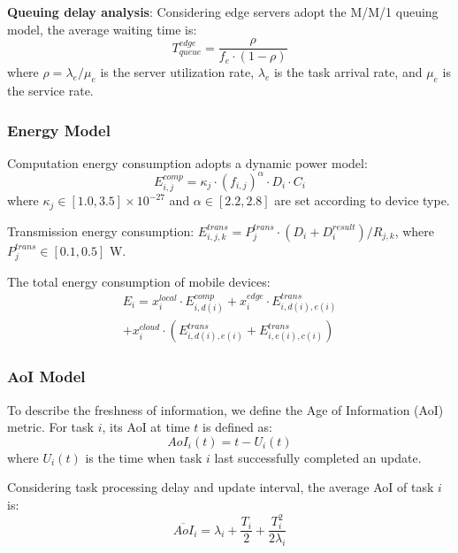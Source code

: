 \documentclass[conference]{IEEEtran}
\begin{document}
\textbf{Queuing delay analysis}: Considering edge servers adopt the M/M/1 queuing model, the average waiting time is:
\begin{equation}
T_{queue}^{edge} = \frac{\rho}{f_e \cdot (1-\rho)}
\end{equation}
where $\rho = \lambda_e / \mu_e$ is the server utilization rate, $\lambda_e$ is the task arrival rate, and $\mu_e$ is the service rate.

\subsubsection{Energy Model}
Computation energy consumption adopts a dynamic power model:
\begin{equation}
E_{i,j}^{comp} = \kappa_j \cdot (f_{i,j})^{\alpha} \cdot D_i \cdot C_i
\end{equation}
where $\kappa_j \in [1.0, 3.5] \times 10^{-27}$ and $\alpha \in [2.2, 2.8]$ are set according to device type.

Transmission energy consumption: $E_{i,j,k}^{trans} = P_j^{trans} \cdot (D_i + D_i^{result})/R_{j,k}$, where $P_j^{trans} \in [0.1, 0.5]$ W.

The total energy consumption of mobile devices:
\begin{equation}
    \begin{split}
        E_i = x_{i}^{local} \cdot E_{i,d(i)}^{comp} + x_{i}^{edge} \cdot E_{i,d(i),e(i)}^{trans} \\ + x_{i}^{cloud} \cdot (E_{i,d(i),e(i)}^{trans} + E_{i,e(i),c(i)}^{trans})
    \end{split}
\end{equation}

\subsubsection{AoI Model}
To describe the freshness of information, we define the Age of Information (AoI) metric. For task $i$, its AoI at time $t$ is defined as:
\begin{equation}
AoI_i(t) = t - U_i(t)
\end{equation}
where $U_i(t)$ is the time when task $i$ last successfully completed an update.

Considering task processing delay and update interval, the average AoI of task $i$ is:
\begin{equation}
\overline{AoI}_i = \lambda_i + \frac{T_i}{2} + \frac{T_i^2}{2\lambda_i}
\end{equation}
\end{document}
